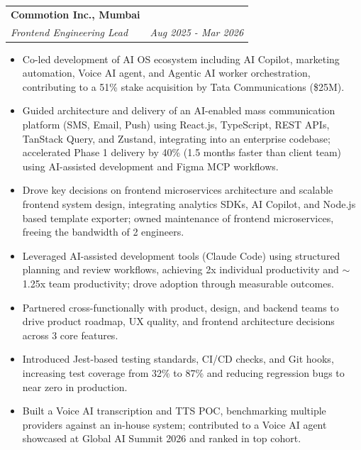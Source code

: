 \documentclass[letterpaper,11pt]{article}
\makeatletter
\newcommand{\resumeItem}[1]{\item \small{#1}}
\newcommand{\resumeSubheading}[4]{
  \vspace{-2pt}\item
  \begin{tabular*}{0.97\textwidth}[t]{l@{\extracolsep{\fill}}r}
    \textbf{#1} & #2 \\
    \textit{\small#3} & \textit{\small #4} \\
  \end{tabular*}\vspace{-6pt}
}
\newcommand{\resumeItemListStart}{\begin{itemize}[leftmargin=0.2in, label=\textbullet]}
\newcommand{\resumeItemListEnd}{\end{itemize}\vspace{-5pt}}
\makeatother
\begin{document}
\resumeSubheading
{Commotion Inc., Mumbai}{}{Frontend Engineering Lead}{Aug 2025 - Mar 2026}
\resumeItemListStart
\resumeItem{Co-led development of AI OS ecosystem including AI Copilot, marketing automation, Voice AI agent, and Agentic AI worker orchestration, contributing to a 51\% stake acquisition by Tata Communications (\$25M).}
\resumeItem{Guided architecture and delivery of an AI-enabled mass communication platform (SMS, Email, Push) using React.js, TypeScript, REST APIs, TanStack Query, and Zustand, integrating into an enterprise codebase; accelerated Phase 1 delivery by 40\% (1.5 months faster than client team) using AI-assisted development and Figma MCP workflows.}
\resumeItem{Drove key decisions on frontend microservices architecture and scalable frontend system design, integrating analytics SDKs, AI Copilot, and Node.js based template exporter; owned maintenance of frontend microservices, freeing the bandwidth of 2 engineers.}
\resumeItem{Leveraged AI-assisted development tools (Claude Code) using structured planning and review workflows, achieving 2x individual productivity and $\sim$1.25x team productivity; drove adoption through measurable outcomes.}
\resumeItem{Partnered cross-functionally with product, design, and backend teams to drive product roadmap, UX quality, and frontend architecture decisions across 3 core features.}
\resumeItem{Introduced Jest-based testing standards, CI/CD checks, and Git hooks, increasing test coverage from 32\% to 87\% and reducing regression bugs to near zero in production.}
\resumeItem{Built a Voice AI transcription and TTS POC, benchmarking multiple providers against an in-house system; contributed to a Voice AI agent showcased at Global AI Summit 2026 and ranked in top cohort.}
\resumeItemListEnd
\end{document}
